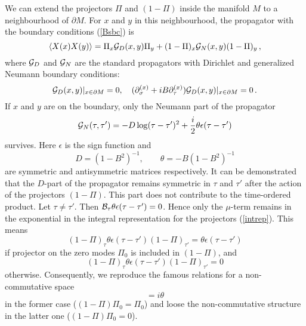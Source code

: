\documentclass[a4paper,12pt,twoside]{article}
\begin{document}
We can extend the projectors $\Pi$ and $(1-\Pi )$ inside the manifold
$M$ to a neighbourhood of $\partial M$. For $x$ and $y$ in this
neighbourhood,
the propagator with the boundary conditions (\ref{Bsbc}) is
\begin{equation}
\langle X (x) X(y) \rangle = \Pi_x {\cal G}_D(x,y) \Pi_y
+(1-\Pi )_x {\cal G}_N(x,y) (1-\Pi )_y \,,  
\label{prop}
\end{equation}
where ${\cal G}_D$ and ${\cal G}_N$ are the standard propagators
with Dirichlet and generalized Neumann boundary conditions:
\begin{equation}
{\cal G}_D(x,y)\vert_{x\in \partial M}=0,\quad
(\partial_\sigma^{(x)} +iB\partial_\tau^{(x)} )
{\cal G}_D(x,y)\vert_{x\in \partial M}=0 \,.\label{DNpro}
\end{equation}
If $x$ and $y$ are on the boundary, only the Neumann
part of the propagator \cite{Schomerus:1999ug,Seiberg:1999vs}
\begin{equation}
{\cal G}_N(\tau,\tau')=-D \log (\tau -\tau')^2 +\frac i2 \theta
\epsilon (\tau -\tau') \label{Npro}
\end{equation}
survives. Here $\epsilon$ is the sign function and
\begin{equation}
D=(1-B^2)^{-1},\qquad \theta = -B (1-B^2)^{-1} \label{Dtheta}
\end{equation}
are symmetric and antisymmetric matrices respectively. It can be
demonstrated that the $D$-part of the propagator remains
symmetric in $\tau$ and $\tau'$ after the action of the
projectors $(1-\Pi )$. This part does not contribute
to the time-ordered product. Let $\tau\ne\tau'$.
Then ${\cal B}_\tau \theta \epsilon (\tau -\tau')=0$. Hence 
only the $\mu$-term remains in the exponential
in the integral representation for the projectors (\ref{intrep}). 
This means
\begin{equation}
(1-\Pi )_\tau \theta \epsilon (\tau -\tau') (1-\Pi )_{\tau'}=
\theta \epsilon (\tau -\tau') \label{1616}
\end{equation}
if projector on the zero modes $\Pi_0$ is included in $(1-\Pi )$,
and
\begin{equation}
(1-\Pi )_\tau \theta \epsilon (\tau -\tau') (1-\Pi )_{\tau'}=0
\label{1617}
\end{equation}
otherwise. Consequently, we reproduce the famous relations for
a non-commutative space \cite{Schomerus:1999ug,Seiberg:1999vs}
\begin{equation}
[X(\tau),X(\tau')]=i\theta \label{noncom}
\end{equation}
in the former case ($(1-\Pi)\Pi_0=\Pi_0$) and loose the non-commutative
structure in the latter one ($(1-\Pi)\Pi_0=0$). 
\end{document}
